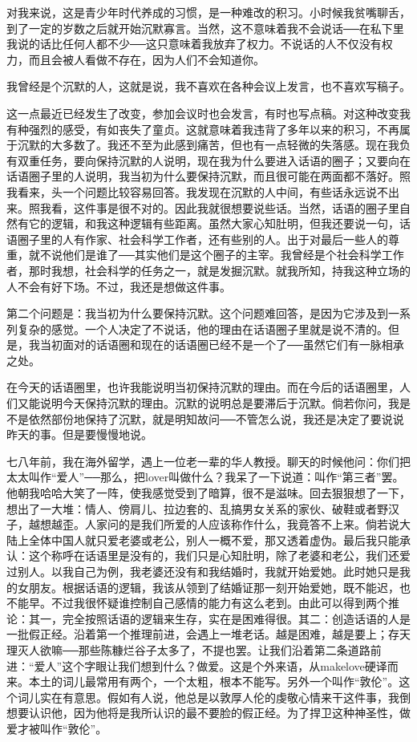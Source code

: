 对我来说，这是青少年时代养成的习惯，是一种难改的积习。小时候我贫嘴聊舌，到了一定的岁数之后就开始沉默寡言。当然，这不意味着我不会说话──在私下里我说的话比任何人都不少──这只意味着我放弃了权力。不说话的人不仅没有权力，而且会被人看做不存在，因为人们不会知道你。 

我曾经是个沉默的人，这就是说，我不喜欢在各种会议上发言，也不喜欢写稿子。 

这一点最近已经发生了改变，参加会议时也会发言，有时也写点稿。对这种改变我有种强烈的感受，有如丧失了童贞。这就意味着我违背了多年以来的积习，不再属于沉默的大多数了。我还不至为此感到痛苦，但也有一点轻微的失落感。现在我负有双重任务，要向保持沉默的人说明，现在我为什么要进入话语的圈子；又要向在话语圈子里的人说明，我当初为什么要保持沉默，而且很可能在两面都不落好。照我看来，头一个问题比较容易回答。我发现在沉默的人中间，有些话永远说不出来。照我看，这件事是很不对的。因此我就很想要说些话。当然，话语的圈子里自然有它的逻辑，和我这种逻辑有些距离。虽然大家心知肚明，但我还要说一句，话语圈子里的人有作家、社会科学工作者，还有些别的人。出于对最后一些人的尊重，就不说他们是谁了──其实他们是这个圈子的主宰。我曾经是个社会科学工作者，那时我想，社会科学的任务之一，就是发掘沉默。就我所知，持我这种立场的人不会有好下场。不过，我还是想做这件事。 

第二个问题是：我当初为什么要保持沉默。这个问题难回答，是因为它涉及到一系列复杂的感觉。一个人决定了不说话，他的理由在话语圈子里就是说不清的。但是，我当初面对的话语圈和现在的话语圈已经不是一个了──虽然它们有一脉相承之处。 

在今天的话语圈里，也许我能说明当初保持沉默的理由。而在今后的话语圈里，人们又能说明今天保持沉默的理由。沉默的说明总是要滞后于沉默。倘若你问，我是不是依然部份地保持了沉默，就是明知故问──不管怎么说，我还是决定了要说说昨天的事。但是要慢慢地说。 

七八年前，我在海外留学，遇上一位老一辈的华人教授。聊天的时候他问：你们把太太叫作“爱人”──那么，把lover叫做什么？我呆了一下说道：叫作“第三者”罢。他朝我哈哈大笑了一阵，使我感觉受到了暗算，很不是滋味。回去狠狠想了一下，想出了一大堆：情人、傍肩儿、拉边套的、乱搞男女关系的家伙、破鞋或者野汉子，越想越歪。人家问的是我们所爱的人应该称作什么，我竟答不上来。倘若说大陆上全体中国人就只爱老婆或老公，别人一概不爱，那又透着虚伪。最后我只能承认：这个称呼在话语里是没有的，我们只是心知肚明，除了老婆和老公，我们还爱过别人。以我自己为例，我老婆还没有和我结婚时，我就开始爱她。此时她只是我的女朋友。根据话语的逻辑，我该从领到了结婚证那一刻开始爱她，既不能迟，也不能早。不过我很怀疑谁控制自己感情的能力有这么老到。由此可以得到两个推论：其一，完全按照话语的逻辑来生存，实在是困难得很。其二：创造话语的人是一批假正经。沿着第一个推理前进，会遇上一堆老话。越是困难，越是要上；存天理灭人欲嘛──那些陈糠烂谷子太多了，不提也罢。让我们沿着第二条道路前进：“爱人”这个字眼让我们想到什么？做爱。这是个外来语，从makelove硬译而来。本土的词儿最常用有两个，一个太粗，根本不能写。另外一个叫作“敦伦”。这个词儿实在有意思。假如有人说，他总是以敦厚人伦的虔敬心情来干这件事，我倒想要认识他，因为他将是我所认识的最不要脸的假正经。为了捍卫这种神圣性，做爱才被叫作“敦伦”。 

